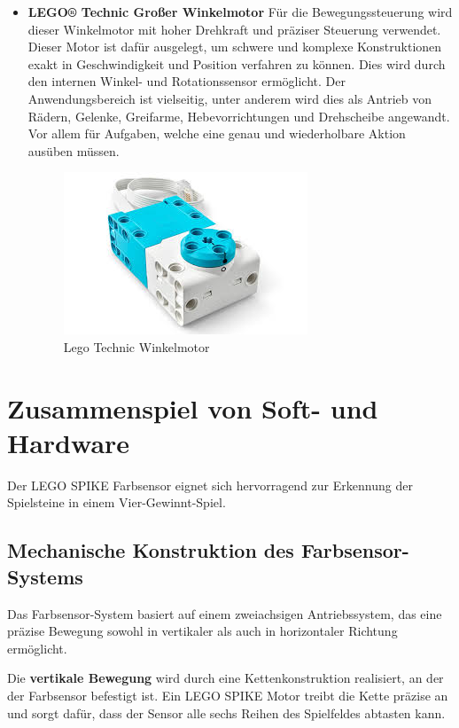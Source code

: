 \begin{itemize}
\item \textbf{LEGO® Technic Großer Winkelmotor}
Für die Bewegungssteuerung wird dieser Winkelmotor mit hoher Drehkraft und präziser Steuerung verwendet. Dieser Motor ist dafür ausgelegt, um schwere und komplexe Konstruktionen exakt in Geschwindigkeit und Position verfahren zu können. Dies wird durch den internen Winkel- und Rotationssensor ermöglicht. Der Anwendungsbereich ist vielseitig, unter anderem wird dies als Antrieb von Rädern, Gelenke, Greifarme, Hebevorrichtungen und Drehscheibe angewandt. Vor allem für Aufgaben, welche eine genau und wiederholbare Aktion ausüben müssen.

\begin{figure}[H]
	\centering
	\includegraphics[width=0.5\linewidth]{images/Motor}
	\caption{Lego Technic Winkelmotor}
	\label{fig:motor}
\end{figure}

\end{itemize}

\section{Zusammenspiel von Soft- und Hardware}

Der LEGO SPIKE Farbsensor eignet sich hervorragend zur Erkennung der Spielsteine in einem Vier-Gewinnt-Spiel. 

\subsection{Mechanische Konstruktion des Farbsensor-Systems}

Das Farbsensor-System basiert auf einem zweiachsigen Antriebssystem, das eine präzise Bewegung sowohl in vertikaler als auch in horizontaler Richtung ermöglicht. 

Die \textbf{vertikale Bewegung} wird durch eine Kettenkonstruktion realisiert, an der der Farbsensor befestigt ist. Ein LEGO SPIKE Motor treibt die Kette präzise an und sorgt dafür, dass der Sensor alle sechs Reihen des Spielfeldes abtasten kann. 

